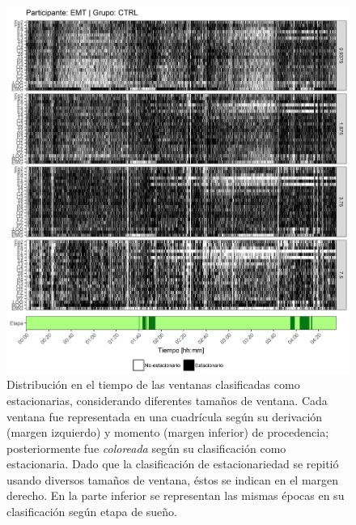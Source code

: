 \documentclass[12pt,letterpaper,draft]{book}
\begin{document}
\begin{figure}
\centering
\includegraphics[width=\linewidth]
{./scripts_graf_res/EMT_patrones_1.png}
\caption[Distribución en el tiempo de las ventanas clasificadas como estacionarias, considerando diferentes tamaños de ventana]{Distribución en el tiempo de las ventanas clasificadas como estacionarias, considerando diferentes tamaños de ventana. 
Cada ventana fue representada en una cuadrícula según su derivación (margen izquierdo) y momento (margen inferior) de procedencia; posteriormente fue \textit{coloreada} según su clasificación como estacionaria.
Dado que la clasificación de estacionariedad se repitió usando diversos tamaños de ventana, éstos se indican en el margen derecho.
En la parte inferior se representan las mismas épocas en su clasificación según etapa de sueño.}
\end{figure}
\end{document}
